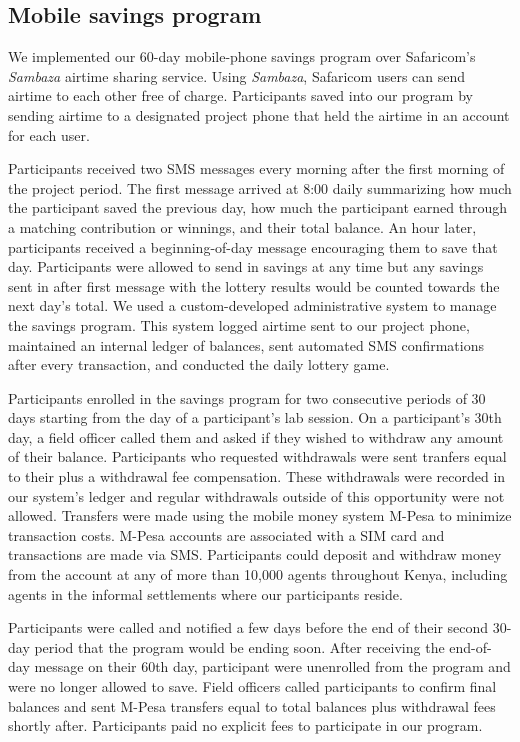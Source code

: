 \documentclass[11pt]{article}
\begin{document}

		\clearpage

	\subsection{Mobile savings program}

		We implemented our 60-day mobile-phone savings program over Safaricom's \textit{Sambaza} airtime sharing service. Using \textit{Sambaza}, Safaricom users can send airtime to each other free of charge. Participants saved into our program by sending airtime to a designated project phone that held the airtime in an account for each user.

		Participants received two SMS messages every morning after the first morning of the project period. The first message arrived at 8:00 daily summarizing how much the participant saved the previous day, how much the participant earned through a matching contribution or winnings, and their total balance. An hour later, participants received a beginning-of-day message encouraging them to save that day. Participants were allowed to send in savings at any time but any savings sent in after first message with the lottery results would be counted towards the next day's total. We used a custom-developed administrative system to manage the savings program. This system logged airtime sent to our project phone, maintained an internal ledger of balances, sent automated SMS confirmations after every transaction, and conducted the daily lottery game.

		Participants enrolled in the savings program for two consecutive periods of 30 days starting from the day of a participant's lab session. On a participant's 30th day, a field officer called them and asked if they wished to withdraw any amount of their balance. Participants who requested withdrawals were sent tranfers equal to their plus a withdrawal fee compensation. These withdrawals were recorded in our system's ledger and regular withdrawals outside of this opportunity were not allowed. Transfers were made using the mobile money system M-Pesa to minimize transaction costs. M-Pesa accounts are associated with a SIM card and transactions are made via SMS. Participants could deposit and withdraw money from the account at any of more than 10,000 agents throughout Kenya, including agents in the informal settlements where our participants reside.

		Participants were called and notified a few days before the end of their second 30-day period that the program would be ending soon. After receiving the end-of-day message on their 60th day, participant were unenrolled from the program and were no longer allowed to save. Field officers called participants to confirm final balances and sent M-Pesa transfers equal to total balances plus withdrawal fees shortly after. Participants paid no explicit fees to participate in our program.
\end{document}
